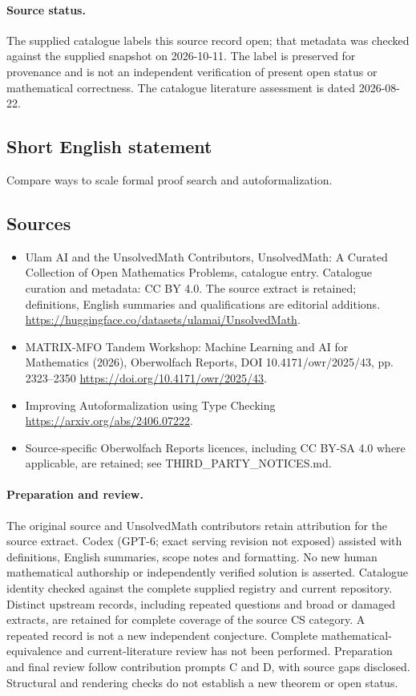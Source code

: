 \documentclass[11pt]{article}
\begin{document}
\paragraph{Source status.}
The supplied catalogue labels this source record open; that metadata was checked against the supplied snapshot on 2026-10-11. The label is preserved for provenance and is not an independent verification of present open status or mathematical correctness. The catalogue literature assessment is dated 2026-08-22.
\subsection{Short English statement}
Compare ways to scale formal proof search and autoformalization.
\subsection{Sources}
\begin{itemize}
\item[S1] Ulam AI and the UnsolvedMath Contributors, UnsolvedMath: A Curated Collection of Open Mathematics Problems, catalogue entry. Catalogue curation and metadata: CC BY 4.0. The source extract is retained; definitions, English summaries and qualifications are editorial additions.
\url{https://huggingface.co/datasets/ulamai/UnsolvedMath}.
\item[S2] MATRIX-MFO Tandem Workshop: Machine Learning and AI for Mathematics (2026), Oberwolfach Reports, DOI 10.4171/owr/2025/43, pp. 2323--2350
\url{https://doi.org/10.4171/owr/2025/43}.
\item[S3] Improving Autoformalization using Type Checking
\url{https://arxiv.org/abs/2406.07222}.
\item Source-specific Oberwolfach Reports licences, including CC BY-SA 4.0 where applicable, are retained; see THIRD\_PARTY\_NOTICES.md.
\end{itemize}
\paragraph{Preparation and review.}
The original source and UnsolvedMath contributors retain attribution for the source extract. Codex (GPT-6; exact serving revision not exposed) assisted with definitions, English summaries, scope notes and formatting. No new human mathematical authorship or independently verified solution is asserted. Catalogue identity checked against the complete supplied registry and current repository. Distinct upstream records, including repeated questions and broad or damaged extracts, are retained for complete coverage of the source CS category. A repeated record is not a new independent conjecture. Complete mathematical-equivalence and current-literature review has not been performed. Preparation and final review follow contribution prompts C and D, with source gaps disclosed. Structural and rendering checks do not establish a new theorem or open status.
\label{end:statement}
\end{document}
